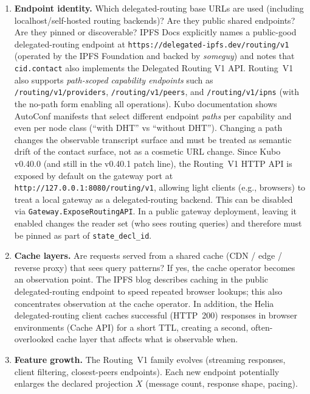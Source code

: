 \documentclass[11pt]{article}
\begin{document}
\begin{enumerate}[leftmargin=*]
\item \textbf{Endpoint identity.} Which delegated-routing base URLs are used (including localhost/self-hosted routing backends)? Are they public shared endpoints? Are they pinned or discoverable?
IPFS Docs explicitly names a public-good delegated-routing endpoint at \texttt{https://delegated-ipfs.dev/routing/v1} (operated by the IPFS Foundation and backed by \emph{someguy}) and notes that \texttt{cid.contact} also implements the Delegated Routing V1 API.\cite{ipfsDocsNodes}
Routing~V1 also supports \emph{path-scoped capability endpoints} such as \texttt{/routing/v1/providers}, \texttt{/routing/v1/peers}, and \texttt{/routing/v1/ipns} (with the no-path form enabling all operations). Kubo documentation shows AutoConf manifests that select different endpoint \emph{paths} per capability and even per node class (``with DHT'' vs ``without DHT''). Changing a path changes the observable transcript surface and must be treated as semantic drift of the contact surface, not as a cosmetic URL change.\cite{kuboConfigPathRouting,ipfsDelegatedRoutingV1Spec}
Since Kubo v0.40.0 (and still in the v0.40.1 patch line), the Routing~V1 HTTP API is exposed by default on the gateway port at \texttt{http://127.0.0.1:8080/routing/v1}, allowing light clients (e.g., browsers) to treat a local gateway as a delegated-routing backend.\cite{kuboReleaseV040,kuboReleaseV0401}
This can be disabled via \texttt{Gateway.ExposeRoutingAPI}. In a public gateway deployment, leaving it enabled changes the reader set (who sees routing queries) and therefore must be pinned as part of \texttt{state\_decl\_id}.\cite{kuboConfigExposeRoutingAPI}
\item \textbf{Cache layers.} Are requests served from a shared cache (CDN / edge / reverse proxy) that sees query patterns? If yes, the cache operator becomes an observation point.
The IPFS blog describes caching in the public delegated-routing endpoint to speed repeated browser lookups; this also concentrates observation at the cache operator.\cite{blogDelegatedRoutingCaching2025}
In addition, the Helia delegated-routing client caches successful (HTTP~200) responses in browser environments (Cache API) for a short TTL, creating a second, often-overlooked cache layer that affects what is observable when.\cite{heliaDelegatedRoutingClientCache}
\item \textbf{Feature growth.} The Routing~V1 family evolves (streaming responses, client filtering, closest-peers endpoints).\cite{ipip0410,ipip0484,ipip0476}
Each new endpoint potentially enlarges the declared projection $X$ (message count, response shape, pacing).
\end{enumerate}
\end{document}
